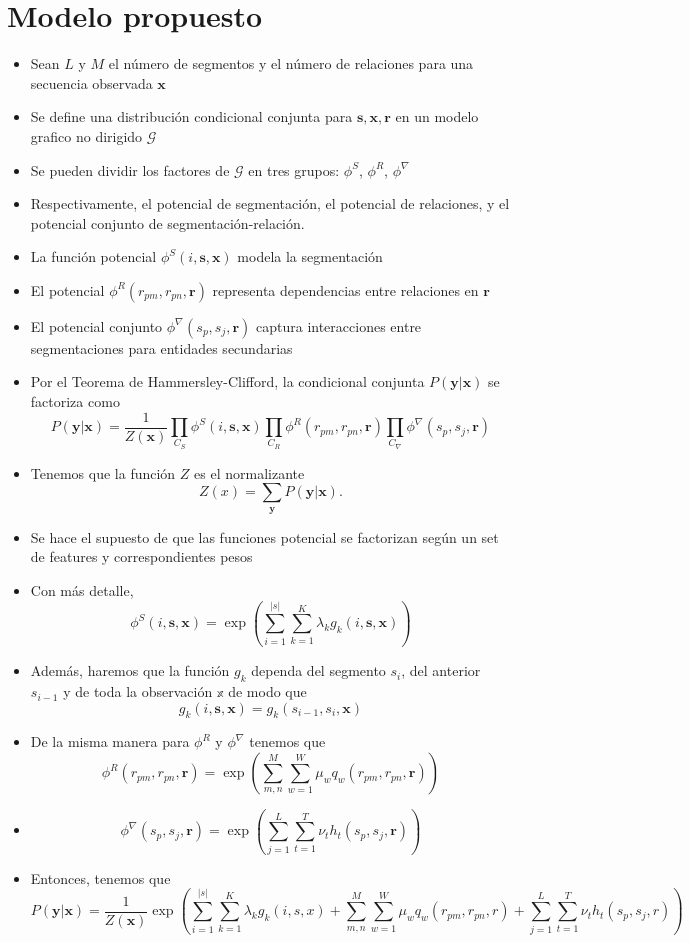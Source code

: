 \documentclass[11pt]{article}
\theoremstyle{plain}
\begin{document}
\section{Modelo propuesto}
\begin{itemize}
\item Sean $L$ y $M$ el número de segmentos y el número de relaciones para una secuencia observada $\mathbf{x}$
\item Se define una distribución condicional conjunta para $\mathbf{s},\mathbf{x},\mathbf{r}$ en un modelo grafico no dirigido $\mathcal{G}$
\item Se pueden dividir los factores de $\mathcal{G}$ en tres grupos: $\phi^S$, $\phi^R$, $\phi^\nabla$
\item Respectivamente, el potencial de segmentación, el potencial de relaciones, y el potencial conjunto de segmentación-relación.
\item La función potencial $\phi^S(i,\mathbf{s},\mathbf{x})$ modela la segmentación 
\item El potencial $\phi^R(r_{pm},r_{pn},\mathbf{r})$ representa dependencias entre relaciones en $\mathbf{r}$
\item El potencial conjunto $\phi^\nabla(s_p,s_j,\mathbf{r})$ captura interacciones entre segmentaciones para entidades secundarias
\item Por el Teorema de Hammersley-Clifford, la condicional conjunta $P(\mathbf{y} | \mathbf{x})$ se factoriza como
\[ P(\mathbf{y} | \mathbf{x}) = \frac{1}{Z(\mathbf{x})} \prod_{C_S} \phi^S (i,\mathbf{s},\mathbf{x}) \prod_{C_R}\phi^R(r_{pm},r_{pn},\mathbf{r}) \prod_{C_\nabla} \phi^\nabla(s_p,s_j,\mathbf{r}) \]
\item Tenemos que la función $Z$ es el normalizante
\[ Z(x)= \sum_{\mathbf{y}} P(\mathbf{y} | \mathbf{x}). \]
\item Se hace el supuesto de que las funciones potencial se factorizan según un set de features y correspondientes pesos
\item Con más detalle,
\[  \phi^S (i,\mathbf{s},\mathbf{x}) = \exp( \sum_{i=1}^{|s|} \sum_{k=1}^K \lambda_k g_k (i,\mathbf{s},\mathbf{x}))\]
\item Además, haremos que la función $g_k$ dependa del segmento $s_i$, del anterior $s_{i-1}$ y de toda la observación $\mathbb{x}$ de modo que
\[  g_k (i,\mathbf{s},\mathbf{x}) = g_k(s_{i-1},s_i, \mathbf{x})\]
\item De la misma manera para $\phi^R$ y $\phi^\nabla$ tenemos que
\[ \phi^R(r_{pm},r_{pn},\mathbf{r}) = \exp ( \sum_{m,n}^M  \sum_{w=1}^W \mu_w q_w (r_{pm},r_{pn},\mathbf{r})) \]
\item 
\[ \phi^\nabla(s_p,s_j,\mathbf{r}) =\exp(\sum_{j=1}^L \sum_{t=1}^T \nu_t h_t (s_p,s_j,\mathbf{r} ))\]
\item Entonces, tenemos que 
\[P(\mathbf{y} | \mathbf{x}) = \frac{1}{Z(\mathbf{x})} \exp \left( \sum_{i=1}^{|s|} \sum_{k=1}^K \lambda_k g_k(i,s,x) + \sum_{m,n}^M \sum_{w=1}^W \mu_w q_w (r_{pm},r_{pn},r) + \sum_{j=1}^L \sum_{t=1}^T  \nu_t h_t(s_p,s_j,r) \right) \]
\end{itemize}
\end{document}
